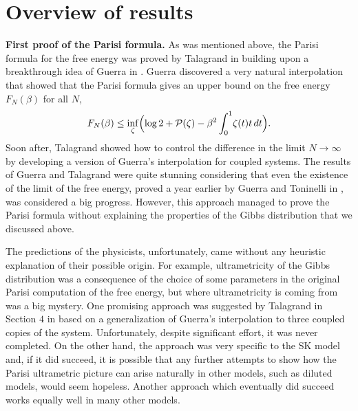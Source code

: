 \documentclass[12pt]{article}
\newcommand{\PP}{{\cal P}}
\theoremstyle{nonumberplain}
\begin{document}
\section{Overview of results}

\textbf{First proof of the Parisi formula.} As was mentioned above, the Parisi formula for the free energy was proved by Talagrand in \cite{TPF} building upon a breakthrough idea of Guerra in \cite{Guerra}. Guerra discovered a very natural interpolation that showed that the Parisi formula gives an upper bound on the free energy $F_N(\beta)$ for all $N$,
$$
F_N(\beta) \leq \inf_{\zeta}\Bigl(\log 2 + \PP(\zeta) -{\beta^2}\int_{0}^{1}\! \zeta(t)t\, dt\Bigr).
$$
 Soon after, Talagrand showed how to control the difference in the limit $N\to\infty$ by developing a version of Guerra's interpolation for coupled systems. The results of Guerra and Talagrand were quite stunning considering that even the existence of the limit of the free energy, proved a year earlier by Guerra and Toninelli in \cite{GuerraToninelli}, was considered a big progress. However, this approach managed to prove the Parisi formula without explaining the properties of the Gibbs distribution that we discussed above. 

The predictions of the physicists, unfortunately, came without any heuristic explanation of their possible origin. For example, ultrametricity of the Gibbs distribution was a consequence of the choice of some parameters in the original Parisi computation of the free energy, but where ultrametricity is coming from was a big mystery. One promising approach was suggested by Talagrand in Section $4$ in \cite{TalUltra} based on a generalization of Guerra's interpolation to three coupled copies of the system.  Unfortunately, despite significant effort, it was never completed. On the other hand, the approach was very specific to the SK model and, if it did succeed, it is possible that any further attempts to show how the Parisi ultrametric picture can arise naturally in other models, such as diluted models, would seem hopeless. Another approach which eventually did succeed works equally well in many other models.
\end{document}
